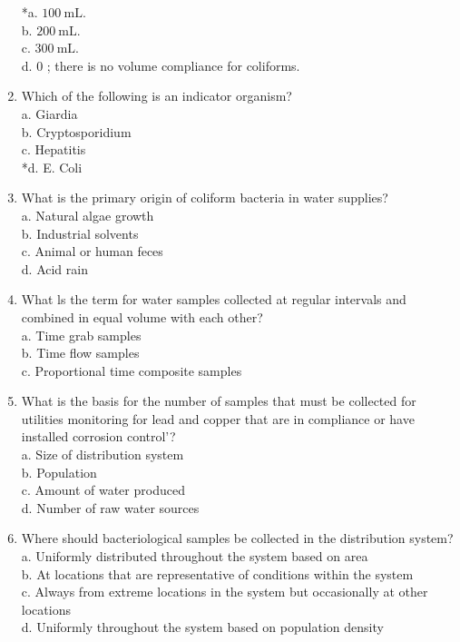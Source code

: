 \begin{enumerate}[1.]
*a. $100 \mathrm{~mL}$.\\
b. $200 \mathrm{~mL}$.\\
c. $300 \mathrm{~mL}$.\\
d. 0 ; there is no volume compliance for coliforms.\\
\item Which of the following is an indicator organism?\\
a. Giardia\\
b. Cryptosporidium\\
c. Hepatitis\\
*d. E. Coli\\
\item What is the primary origin of coliform bacteria in water supplies?\\
a. Natural algae growth\\
b. Industrial solvents\\
c. Animal or human feces\\
d. Acid rain\\
\item What ls the term for water samples collected at regular intervals and combined in equal volume with each other?\\
a. Time grab samples\\
b. Time flow samples\\
c. Proportional time composite samples\\
\item What is the basis for the number of samples that must be collected for utilities monitoring for lead and copper that are in compliance or have installed corrosion control'?\\
a. Size of distribution system\\
b. Population\\
c. Amount of water produced\\
d. Number of raw water sources\\
\item Where should bacteriological samples be collected in the distribution system?\\
a. Uniformly distributed throughout the system based on area\\
b. At locations that are representative of conditions within the system\\
c. Always from extreme locations in the system but occasionally at other locations\\
d. Uniformly throughout the system based on population density\\

\end{enumerate}
